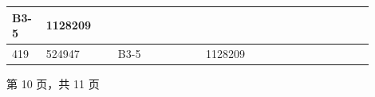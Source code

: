 \documentclass[UTF8,10pt,a4paper,fontset=fandol]{ctexart}
\newcommand{\fieldvalue}[1]{#1}
\begin{document}
\begin{center}
\begin{tabular}{|p{0.08\linewidth}|p{0.18\linewidth}|p{0.22\linewidth}|p{0.22\linewidth}|p{0.20\linewidth}|}
\fieldvalue{B3-5} &
\fieldvalue{1128209} & \\ \hline
\fieldvalue{419} &
\fieldvalue{524947} &
\fieldvalue{B3-5} &
\fieldvalue{1128209} & \\ \hline
\end{tabular}

\vspace{0.5em}

第 10 页，共 11 页
\end{center}

\newpage
\end{document}
